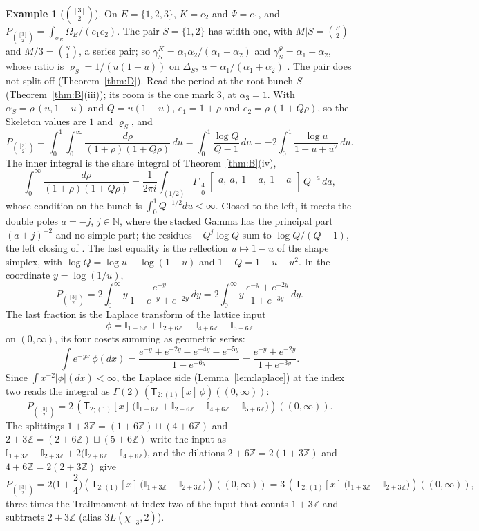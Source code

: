 \documentclass[11pt]{article}
\theoremstyle{plain}
\theoremstyle{definition}
\newtheorem{example}[prop]{Example}
\theoremstyle{remark}
\newcommand{\Z}{\mathbb Z}
\newcommand{\N}{\mathbb N}
\newcommand{\sT}{\mathsf T}
\newcommand{\Gst}[4]{\Gamma_{\substack{#1\\#2}}\!\begin{bmatrix}#3\\#4\end{bmatrix}}
\newcommand{\Ilat}[1]{\mathbb I_{#1}}
\newcommand{\Tx}[3]{(\sT_{#1;(1)}[x]\,#2)((#3,\infty))}
\begin{document}
\begin{example}[$\binom{[3]}2$]\label{ex:U23}
On $E=\{1,2,3\}$, $K=e_2$ and $\Psi=e_1$, and $P_{\binom{[3]}2}=\int_{\sigma_E}\Omega_E/(e_1e_2)$. The pair $S=\{1,2\}$ has width one, with $M|S=\binom S2$ and $M/3=\binom S1$, a series pair; so $\gamma^K_S=\alpha_1\alpha_2/(\alpha_1+\alpha_2)$ and $\gamma^\Psi_S=\alpha_1+\alpha_2$, whose ratio is $\varrho_S=1/(u(1-u))$ on $\Delta_S$, $u=\alpha_1/(\alpha_1+\alpha_2)$ \cite[Prop.~18.5, p.~116]{F}. The pair does not split off (Theorem~\ref{thm:D}). Read the period at the root bunch $S$ (Theorem~\ref{thm:B}(iii)); its room is the one mark $3$, at $\alpha_3=1$. With $\alpha_S=\rho\,(u,1-u)$ and $Q=u(1-u)$, $e_1=1+\rho$ and $e_2=\rho\,(1+Q\rho)$, so the Skeleton values are $1$ and $\varrho_S$, and
\[
P_{\binom{[3]}2}=\int_0^1\int_0^\infty\frac{d\rho}{(1+\rho)(1+Q\rho)}\,du=\int_0^1\frac{\log Q}{Q-1}\,du=-2\int_0^1\frac{\log u}{1-u+u^2}\,du .
\]
The inner integral is the share integral of Theorem~\ref{thm:B}(iv),
\[
\int_0^\infty\frac{d\rho}{(1+\rho)(1+Q\rho)}=\frac1{2\pi i}\int_{(1/2)}\Gst40{a,\ a,\ 1-a,\ 1-a}{}\,Q^{-a}\,da,
\]
whose condition on the bunch is $\int_0^1Q^{-1/2}du<\infty$. Closed to the left, it meets the double poles $a=-j$, $j\in\N$, where the stacked Gamma has the principal part $(a+j)^{-2}$ and no simple part; the residues $-Q^j\log Q$ sum to $\log Q/(Q-1)$, the left closing of \cite[Lemma~5.16(ii), p.~34]{F}. The last equality is the reflection $u\mapsto1-u$ of the shape simplex, with $\log Q=\log u+\log(1-u)$ and $1-Q=1-u+u^2$. In the coordinate $y=\log(1/u)$,
\[
P_{\binom{[3]}2}=2\int_0^\infty y\,\frac{e^{-y}}{1-e^{-y}+e^{-2y}}\,dy=2\int_0^\infty y\,\frac{e^{-y}+e^{-2y}}{1+e^{-3y}}\,dy .
\]
The last fraction is the Laplace transform of the lattice input
\[
\phi=\Ilat{1+6\Z}+\Ilat{2+6\Z}-\Ilat{4+6\Z}-\Ilat{5+6\Z}
\]
on $(0,\infty)$, its four cosets summing as geometric series:
\[
\int e^{-yx}\,\phi(dx)=\frac{e^{-y}+e^{-2y}-e^{-4y}-e^{-5y}}{1-e^{-6y}}=\frac{e^{-y}+e^{-2y}}{1+e^{-3y}} .
\]
Since $\int x^{-2}|\phi|(dx)<\infty$, the Laplace side (Lemma~\ref{lem:laplace}) at the index two reads the integral as $\Gamma(2)\,\Tx{2}{\phi}{0}$:
\[
P_{\binom{[3]}2}=2\,\Tx{2}{\big(\Ilat{1+6\Z}+\Ilat{2+6\Z}-\Ilat{4+6\Z}-\Ilat{5+6\Z}\big)}{0}.
\]
The splittings $1+3\Z=(1+6\Z)\sqcup(4+6\Z)$ and $2+3\Z=(2+6\Z)\sqcup(5+6\Z)$ write the input as $\Ilat{1+3\Z}-\Ilat{2+3\Z}+2\big(\Ilat{2+6\Z}-\Ilat{4+6\Z}\big)$, and the dilations $2+6\Z=2(1+3\Z)$ and $4+6\Z=2(2+3\Z)$ \cite[Thm.~5.9, p.~31]{F} give
\[
P_{\binom{[3]}2}=2\Big(1+\frac24\Big)\Tx{2}{\big(\Ilat{1+3\Z}-\Ilat{2+3\Z}\big)}{0}=3\,\Tx{2}{\big(\Ilat{1+3\Z}-\Ilat{2+3\Z}\big)}{0},
\]
three times the Trailmoment at index two of the input that counts $1+3\Z$ and subtracts $2+3\Z$ (alias $3L(\chi_{-3},2)$).
\end{example}
\end{document}
